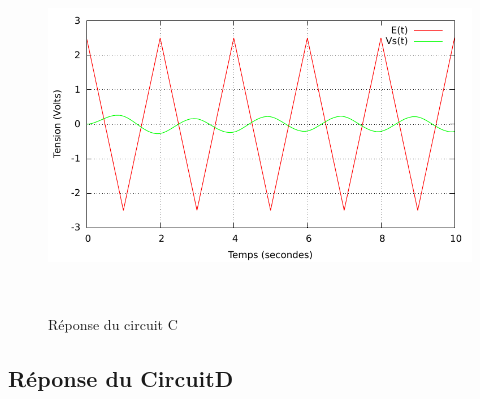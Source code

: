 \documentclass[a4paper,11pt]{article}
\begin{document}
\begin{figure}[h!]
\begin{minipage}[b]{0.5\linewidth}
   \end{minipage}
  \begin{minipage}[b]{0.5\linewidth}   
      \centering \includegraphics[scale=.68]{CCtriangle.pdf}
   \end{minipage}\\
 \caption{Réponse du circuit C}
\end{figure}

\newpage
  \subsection{Réponse du CircuitD}
\end{document}
